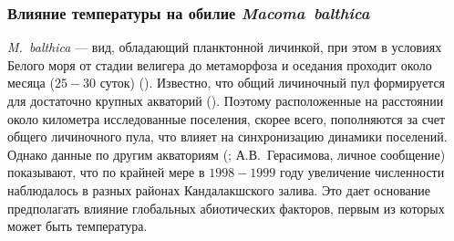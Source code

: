 \subsubsection{Влияние температуры на обилие \textit{Macoma~balthica}}
\textit{M.~balthica} --- вид, обладающий планктонной личинкой, при этом в условиях Белого моря от стадии велигера до метаморфоза и оседания проходит около месяца ($25 - 30$ суток) (\cite{Flyachinskaya_1999}). 
Известно, что общий личиночный пул формируется для достаточно крупных акваторий (\cite{Maximovich_Shilin_2012}). 
Поэтому расположенные на расстоянии около километра исследованные поселения, скорее всего, пополняются за счет общего личиночного пула, что влияет на синхронизацию динамики поселений. 
Однако данные по другим акваториям (\cite{Varfolomeeva_Naumov_2013}; А.В.~Герасимова, личное сообщение) показывают, что по крайней мере в $1998 - 1999$ году увеличение численности наблюдалось в разных районах Кандалакшского залива. 
Это дает основание предполагать влияние глобальных абиотических факторов, первым из которых может быть температура. 


